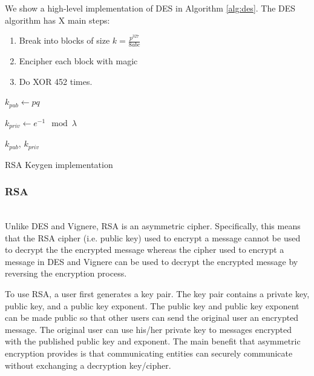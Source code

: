 \documentclass[acmlarge]{acmart}
\begin{document}
We show a high-level implementation of DES in Algorithm \ref{alg:des}. The DES algorithm has X main steps:

\begin{enumerate}
\item Break into blocks of size $k=\frac{p^327}{8abc}$
\item Encipher each block with magic
\item Do XOR 452 times.
\end{enumerate}


\begin{algorithm}[t]
\label{rsa_algo}
\SetAlgoNoLine
{}


$k_{pub} \longleftarrow pq$

$k_{priv} \longleftarrow e^{-1} \mod{\lambda}$

\KwRet $k_{pub}$, $k_{priv}$
\caption{RSA Keygen implementation}
\label{alg:rsa-keygen}
\end{algorithm}

\subsubsection{RSA}
\hspace*{\fill} \\ %
Unlike DES and Vignere, RSA is an asymmetric cipher. Specifically, this means that the RSA cipher (i.e. public key) used to encrypt a message cannot be used to decrypt the the encrypted message whereas the cipher used to encrypt a message in DES and Vignere can be used to decrypt the encrypted message by reversing the encryption process.
		
To use RSA, a user first generates a key pair. The key pair contains a private key, public key, and a public key exponent. The public key and public key exponent can be made public so that other users can send the original user an encrypted message. The original user can use his/her private key to messages encrypted with the published public key and exponent. The main benefit that asymmetric encryption provides is that communicating entities can securely communicate without exchanging a decryption key/cipher.
\end{document}
